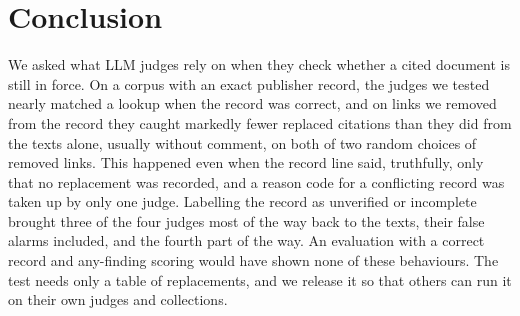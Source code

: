 \section{Conclusion}
\label{sec:conclusion}
We asked what LLM judges rely on when they check whether a cited document is still in force. On a corpus with an
exact publisher record, the judges we tested nearly matched a lookup when the record was correct, and on links we removed from
the record they caught markedly fewer replaced citations than they did from the texts alone, usually without comment,
on both of two random choices of removed links.
This happened even when the record line said, truthfully, only that no replacement was recorded, and a reason code
for a conflicting record was taken up by only one judge. Labelling the
record as unverified or incomplete brought three of the four judges most of the way back to the texts, their false alarms
included, and the fourth part of the way. An evaluation with a
correct record and any-finding scoring would have shown none of these behaviours. The test needs only a table of
replacements, and we release it so that others can run it on their own judges and collections.
